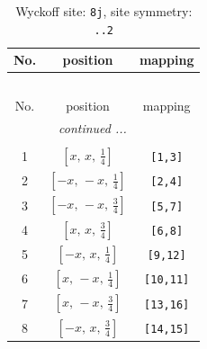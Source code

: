 \documentclass[fleqn,8pt]{jsarticle}
\begin{document}
\begin{longtable}{ccc}
\caption{Wyckoff site: {\tt 8j}, site symmetry: {\tt ..2}}
 \\
 \hline \hline
No. & position & mapping \\ \hline \endfirsthead

\multicolumn{2}{l}{\tablename\ \thetable{}} \\
 \hline \hline
No. & position & mapping \\ \hline \endhead

 \hline \hline
\multicolumn{2}{r}{\footnotesize\it continued ...} \\ \endfoot

 \hline \hline
\multicolumn{2}{r}{} \\ \endlastfoot

1 & $\left[ x,\, x,\, \frac{1}{4} \right]$ & {\tt [1,3]} \\ \hline
2 & $\left[ - x,\, - x,\, \frac{1}{4} \right]$ & {\tt [2,4]} \\ \hline
3 & $\left[ - x,\, - x,\, \frac{3}{4} \right]$ & {\tt [5,7]} \\ \hline
4 & $\left[ x,\, x,\, \frac{3}{4} \right]$ & {\tt [6,8]} \\ \hline
5 & $\left[ - x,\, x,\, \frac{1}{4} \right]$ & {\tt [9,12]} \\ \hline
6 & $\left[ x,\, - x,\, \frac{1}{4} \right]$ & {\tt [10,11]} \\ \hline
7 & $\left[ x,\, - x,\, \frac{3}{4} \right]$ & {\tt [13,16]} \\ \hline
8 & $\left[ - x,\, x,\, \frac{3}{4} \right]$ & {\tt [14,15]} \\
\end{longtable}
\renewcommand{\arraystretch}{1.2}
\end{document}
